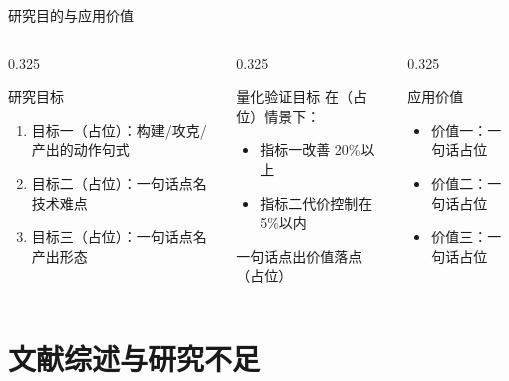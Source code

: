 \documentclass[aspectratio=169,11pt]{beamer}
\begin{document}
\begin{frame}{研究目的与应用价值}
  \footnotesize
  \begin{columns}[T]
    \begin{column}{0.325\textwidth}
      \begin{card}{研究目标}
        \begin{enumerate}
          \item 目标一（占位）：构建/攻克/产出的动作句式
          \item 目标二（占位）：一句话点名技术难点
          \item 目标三（占位）：一句话点名产出形态
        \end{enumerate}
      \end{card}
    \end{column}
    \begin{column}{0.325\textwidth}
      \begin{card}{量化验证目标}
        在（占位）情景下：
        \begin{itemize}
          \item 指标一改善 \textcolor{accent}{20\%以上}
          \item 指标二代价控制在 \textcolor{accent}{5\%以内}
        \end{itemize}
        \vskip0.6mm
        一句话点出价值落点（占位）
      \end{card}
    \end{column}
    \begin{column}{0.325\textwidth}
      \begin{card}{应用价值}
        \begin{itemize}
          \item \textcolor{accent}{价值一}：一句话占位
          \item \textcolor{accent}{价值二}：一句话占位
          \item \textcolor{accent}{价值三}：一句话占位
        \end{itemize}
      \end{card}
    \end{column}
  \end{columns}
\end{frame}

\section{文献综述与研究不足}
\end{document}
